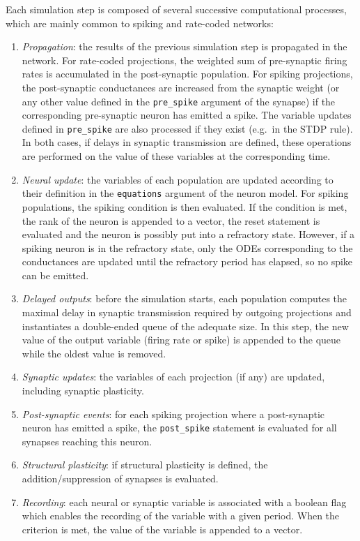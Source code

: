 \documentclass[
  11pt,
  a4paper,
]{scrbook}
\begin{document}
Each simulation step is composed of several successive computational
processes, which are mainly common to spiking and rate-coded networks:

\begin{enumerate}
\def\labelenumi{\arabic{enumi}.}
\item
  \emph{Propagation}: the results of the previous simulation step is
  propagated in the network. For rate-coded projections, the weighted
  sum of pre-synaptic firing rates is accumulated in the post-synaptic
  population. For spiking projections, the post-synaptic conductances
  are increased from the synaptic weight (or any other value defined in
  the \texttt{pre\_spike} argument of the synapse) if the corresponding
  pre-synaptic neuron has emitted a spike. The variable updates defined
  in \texttt{pre\_spike} are also processed if they exist (e.g.~in the
  STDP rule). In both cases, if delays in synaptic transmission are
  defined, these operations are performed on the value of these
  variables at the corresponding time.
\item
  \emph{Neural update}: the variables of each population are updated
  according to their definition in the \texttt{equations} argument of
  the neuron model. For spiking populations, the spiking condition is
  then evaluated. If the condition is met, the rank of the neuron is
  appended to a vector, the reset statement is evaluated and the neuron
  is possibly put into a refractory state. However, if a spiking neuron
  is in the refractory state, only the ODEs corresponding to the
  conductances are updated until the refractory period has elapsed, so
  no spike can be emitted.
\item
  \emph{Delayed outputs}: before the simulation starts, each population
  computes the maximal delay in synaptic transmission required by
  outgoing projections and instantiates a double-ended queue of the
  adequate size. In this step, the new value of the output variable
  (firing rate or spike) is appended to the queue while the oldest value
  is removed.
\item
  \emph{Synaptic updates}: the variables of each projection (if any) are
  updated, including synaptic plasticity.
\item
  \emph{Post-synaptic events}: for each spiking projection where a
  post-synaptic neuron has emitted a spike, the \texttt{post\_spike}
  statement is evaluated for all synapses reaching this neuron.
\item
  \emph{Structural plasticity}: if structural plasticity is defined, the
  addition/suppression of synapses is evaluated.
\item
  \emph{Recording}: each neural or synaptic variable is associated with
  a boolean flag which enables the recording of the variable with a
  given period. When the criterion is met, the value of the variable is
  appended to a vector.
\end{enumerate}
\end{document}
